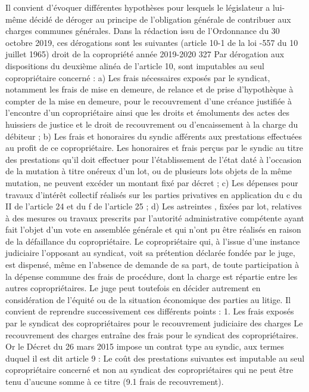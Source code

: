 		Il convient d’évoquer différentes hypothèses pour lesquels le législateur a lui-même décidé de déroger au principe de l’obligation générale de contribuer aux charges communes générales. Dans la rédaction issu de l’Ordonnance du 30 octobre 2019, ces dérogations sont les suivantes (article 10-1 de la loi -557 du 10 juillet 1965)
		droit de la copropriété année 2019-2020
		327
		Par dérogation aux dispositions du deuxième alinéa de l'article 10, sont imputables au seul copropriétaire concerné : a) Les frais nécessaires exposés par le syndicat, notamment les frais de mise en demeure, de relance et de prise d'hypothèque à compter de la mise en demeure, pour le recouvrement d'une créance justifiée à l'encontre d'un copropriétaire ainsi que les droits et émoluments des actes des huissiers de justice et le droit de recouvrement ou d'encaissement à la charge du débiteur ; b) Les frais et honoraires du syndic afférents aux prestations effectuées au profit de ce copropriétaire. Les honoraires et frais perçus par le syndic au titre des prestations qu'il doit effectuer pour l'établissement de l'état daté à l'occasion de la mutation à titre onéreux d'un lot, ou de plusieurs lots objets de la même mutation, ne peuvent excéder un montant fixé par décret ; c) Les dépenses pour travaux d'intérêt collectif réalisés sur les parties privatives en application du c du II de l'article 24 et du f de l'article 25 ; d) Les astreintes , fixées par lot, relatives à des mesures ou travaux prescrits par l'autorité administrative compétente ayant fait l'objet d'un vote en assemblée générale et qui n'ont pu être réalisés en raison de la défaillance du copropriétaire. Le copropriétaire qui, à l'issue d'une instance judiciaire l'opposant au syndicat, voit sa prétention déclarée fondée par le juge, est dispensé, même en l'absence de demande de sa part, de toute participation à la dépense commune des frais de procédure, dont la charge est répartie entre les autres copropriétaires. Le juge peut toutefois en décider autrement en considération de l'équité ou de la situation économique des parties au litige.
		Il convient de reprendre successivement ces différents points :
		1. Les frais exposés par le syndicat des copropriétaires pour le recouvrement judiciaire des charges
		Le recouvrement des charges entraîne des frais pour le syndicat des copropriétaires.
		Or le Décret du 26 mars 2015 impose un contrat type au syndic, aux termes duquel il est dit
		article 9 : Le coût des prestations suivantes est imputable au seul copropriétaire concerné et non au syndicat des copropriétaires qui ne peut être tenu d’aucune somme à ce titre (9.1 frais de recouvrement).
